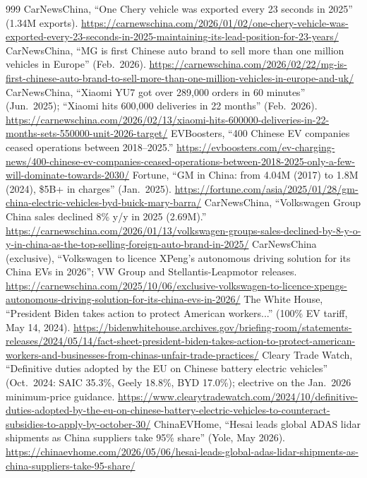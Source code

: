 \begin{thebibliography}{999}
 CarNewsChina, ``One Chery vehicle was exported every 23 seconds in 2025'' (1.34M exports). \url{https://carnewschina.com/2026/01/02/one-chery-vehicle-was-exported-every-23-seconds-in-2025-maintaining-its-lead-position-for-23-years/}
 CarNewsChina, ``MG is first Chinese auto brand to sell more than one million vehicles in Europe'' (Feb.\ 2026). \url{https://carnewschina.com/2026/02/22/mg-is-first-chinese-auto-brand-to-sell-more-than-one-million-vehicles-in-europe-and-uk/}
 CarNewsChina, ``Xiaomi YU7 got over 289,000 orders in 60 minutes'' (Jun.\ 2025); ``Xiaomi hits 600,000 deliveries in 22 months'' (Feb.\ 2026). \url{https://carnewschina.com/2026/02/13/xiaomi-hits-600000-deliveries-in-22-months-sets-550000-unit-2026-target/}
 EVBoosters, ``400 Chinese EV companies ceased operations between 2018--2025.'' \url{https://evboosters.com/ev-charging-news/400-chinese-ev-companies-ceased-operations-between-2018-2025-only-a-few-will-dominate-towards-2030/}
 Fortune, ``GM in China: from 4.04M (2017) to 1.8M (2024), \$5B+ in charges'' (Jan.\ 2025). \url{https://fortune.com/asia/2025/01/28/gm-china-electric-vehicles-byd-buick-mary-barra/}
 CarNewsChina, ``Volkswagen Group China sales declined 8\% y/y in 2025 (2.69M).'' \url{https://carnewschina.com/2026/01/13/volkswagen-groups-sales-declined-by-8-y-o-y-in-china-as-the-top-selling-foreign-auto-brand-in-2025/}
 CarNewsChina (exclusive), ``Volkswagen to licence XPeng's autonomous driving solution for its China EVs in 2026''; VW Group and Stellantis-Leapmotor releases. \url{https://carnewschina.com/2025/10/06/exclusive-volkswagen-to-licence-xpengs-autonomous-driving-solution-for-its-china-evs-in-2026/}
 The White House, ``President Biden takes action to protect American workers...'' (100\% EV tariff, May 14, 2024). \url{https://bidenwhitehouse.archives.gov/briefing-room/statements-releases/2024/05/14/fact-sheet-president-biden-takes-action-to-protect-american-workers-and-businesses-from-chinas-unfair-trade-practices/}
 Cleary Trade Watch, ``Definitive duties adopted by the EU on Chinese battery electric vehicles'' (Oct.\ 2024: SAIC 35.3\%, Geely 18.8\%, BYD 17.0\%); electrive on the Jan.\ 2026 minimum-price guidance. \url{https://www.clearytradewatch.com/2024/10/definitive-duties-adopted-by-the-eu-on-chinese-battery-electric-vehicles-to-counteract-subsidies-to-apply-by-october-30/}
 ChinaEVHome, ``Hesai leads global ADAS lidar shipments as China suppliers take 95\% share'' (Yole, May 2026). \url{https://chinaevhome.com/2026/05/06/hesai-leads-global-adas-lidar-shipments-as-china-suppliers-take-95-share/}

\end{thebibliography}
